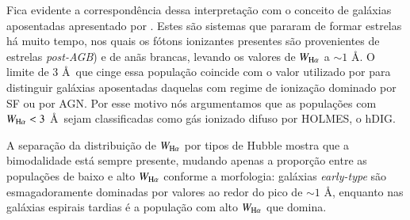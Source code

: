 
Fica evidente a correspondência dessa interpretação com o conceito de galáxias aposentadas apresentado por \citet{Stasinska.etal.2008a}. Estes são sistemas que pararam de formar estrelas há muito tempo, nos quais os fótons ionizantes presentes são provenientes de estrelas {\em post-AGB}) e de anãs brancas, levando os valores de $W_{\Ha}$ a $\sim 1$ \AA. O limite de 3 \AA\ que cinge essa população coincide com o valor utilizado por \citet{CidFernandes.etal.2011a} para distinguir galáxias aposentadas daquelas com regime de ionização dominado por SF ou por AGN. Por esse motivo nós argumentamos que as populações com $W_{\Ha} < 3$ \AA\ sejam classificadas como gás ionizado difuso por HOLMES, o hDIG.

A separação da distribuição de $W_{\Ha}$ por tipos de Hubble mostra que a bimodalidade está sempre presente, mudando apenas a proporção entre as populações de baixo e alto $W_{\Ha}$ conforme a morfologia: galáxias {\em early-type} são esmagadoramente dominadas por valores ao redor do pico de $\sim 1$ \AA, enquanto nas galáxias espirais tardias é a população com alto $W_{\Ha}$ que domina.

